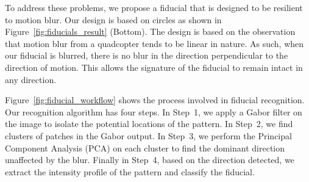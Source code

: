 To address these problems, we propose a fiducial that is designed to be
resilient to motion blur. Our design is based on circles as shown in
Figure~\ref{fig:fiducials_result} (Bottom). The design is based on the
observation that motion blur from a quadcopter tends to be linear in nature. As
such, when our fiducial is blurred, there is no blur in the direction
perpendicular to the direction of motion. This allows the signature of the
fiducial to remain intact in any direction.

Figure~\ref{fig:fiducial_workflow} shows the process involved in fiducial
recognition. Our recognition algorithm has four steps. In Step~1, we apply a Gabor
filter on the image to isolate the potential locations of the pattern.  In
Step~2, we find clusters of patches in the Gabor output.  In Step~3, we perform
the Principal Component Analysis (PCA) on each cluster to find the dominant
direction unaffected by the blur.  Finally in Step~4, based on the
direction detected, we extract the intensity profile of the pattern
and classify the fiducial.

